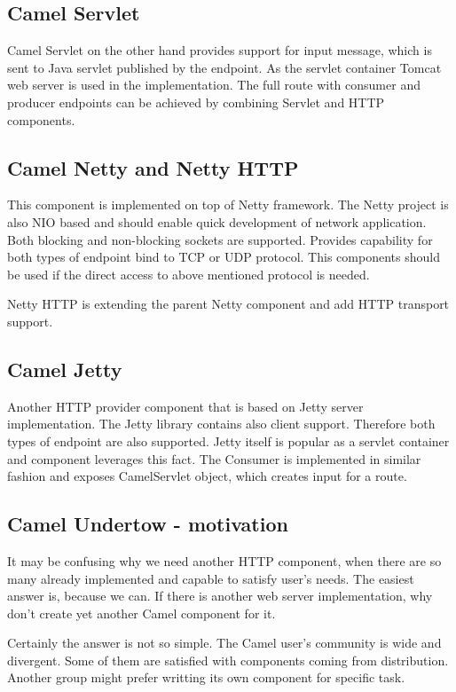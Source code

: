 \documentclass[12pt,final,oneside]{fithesis2}
\begin{document}
\subsection{Camel Servlet}
Camel Servlet on the other hand provides support for input message, which is sent to Java servlet published by the endpoint. As the servlet container Tomcat web server is used in the implementation. The full route with consumer and producer endpoints can be achieved by combining Servlet and HTTP components.

\subsection{Camel Netty and Netty HTTP}
This component is implemented on top of Netty framework. The Netty project is also NIO based and should enable quick development of network application. Both blocking and non-blocking sockets are supported. Provides capability for both types of endpoint bind to TCP or UDP protocol. This components should be used if the direct access to above mentioned protocol is needed.

Netty HTTP is extending the parent Netty component and add HTTP transport support. 

\subsection{Camel Jetty}
Another HTTP provider component that is based on Jetty server implementation. The Jetty library contains also client support. Therefore both types of endpoint are also supported. Jetty itself is popular as a servlet container and component leverages this fact. The Consumer is implemented in similar fashion and exposes CamelServlet object, which creates input for a route.

\subsection{Camel Undertow - motivation}
It may be confusing why we need another HTTP component, when there are so many already implemented and capable to satisfy user's needs. The easiest answer is, because we can. If there is another web server implementation, why don't create yet another Camel component for it. 

Certainly the answer is not so simple. The Camel user's community is wide and divergent. Some of them are satisfied with components coming from distribution. Another group might prefer writting its own component for specific task.
\end{document}
